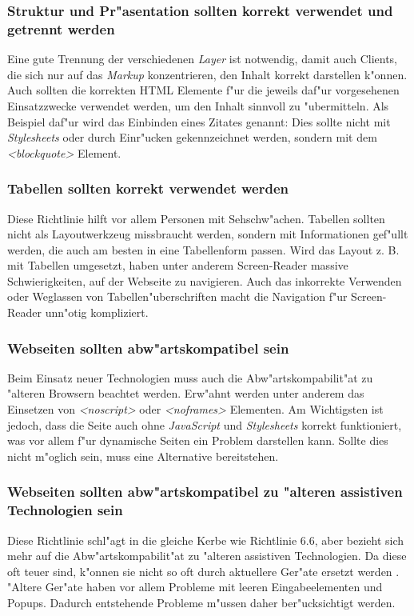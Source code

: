 \documentclass[a4paper,bibtotoc,oneside]{scrbook}
\begin{document}
\subsubsection{Struktur und Pr"asentation sollten korrekt verwendet und getrennt werden}
Eine gute Trennung der verschiedenen \emph{Layer} ist notwendig, damit auch Clients, die sich nur auf das \emph{Markup} konzentrieren, den Inhalt korrekt darstellen k"onnen\cite[S. 42-43]{barr_webd}. Auch sollten die korrekten HTML Elemente f"ur die jeweils daf"ur vorgesehenen Einsatzzwecke verwendet werden, um den Inhalt sinnvoll zu "ubermitteln. Als Beispiel daf"ur wird das Einbinden eines Zitates genannt: Dies sollte nicht mit \emph{Stylesheets} oder durch Einr"ucken gekennzeichnet werden, sondern mit dem \emph{<blockquote>} Element. \cite[Abschnitt 6.3]{wcag1}

\subsubsection{Tabellen sollten korrekt verwendet werden}
Diese Richtlinie hilft vor allem Personen mit Sehschw"achen. Tabellen sollten nicht als Layoutwerkzeug missbraucht werden, sondern mit Informationen gef"ullt werden, die auch am besten in eine Tabellenform passen. Wird das Layout z. B. mit Tabellen umgesetzt, haben unter anderem Screen-Reader massive Schwierigkeiten, auf der Webseite zu navigieren. Auch das inkorrekte Verwenden oder Weglassen von Tabellen"uberschriften macht die Navigation f"ur Screen-Reader unn"otig kompliziert. \cite[Abschnitt 6.5]{wcag1}

\subsubsection{Webseiten sollten abw"artskompatibel sein}
Beim Einsatz neuer Technologien muss auch die Abw"artskompabilit"at zu "alteren Browsern beachtet werden. Erw"ahnt werden unter anderem das Einsetzen von \emph{<noscript>} oder \emph{<noframes>} Elementen. Am Wichtigsten ist jedoch, dass die Seite auch ohne \emph{JavaScript} und \emph{Stylesheets} korrekt funktioniert, was vor allem f"ur dynamische Seiten ein Problem darstellen kann. Sollte dies nicht m"oglich sein, muss eine Alternative bereitstehen. \cite[Abschnitt 6.6]{wcag1}

\subsubsection{Webseiten sollten abw"artskompatibel zu "alteren assistiven Technologien sein}
Diese Richtlinie schl"agt in die gleiche Kerbe wie Richtlinie 6.6, aber bezieht sich mehr auf die Abw"artskompabilit"at zu "alteren assistiven Technologien. Da diese oft teuer sind, k"onnen sie nicht so oft durch aktuellere Ger"ate ersetzt werden \cite[S. 48]{barr_webd}. "Altere Ger"ate haben vor allem Probleme mit leeren Eingabeelementen und Popups. Dadurch entstehende Probleme m"ussen daher ber"ucksichtigt werden. \cite[Abschnitt 6.10]{wcag1}
\end{document}
